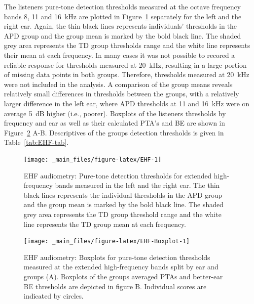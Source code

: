 \documentclass[a4paper, twoside]{templates/ociamthesis}
\begin{document}
The listeners pure-tone detection thresholds measured at the octave frequency bands 8, 11 and 16~kHz are plotted in Figure~\ref{fig:EHF} separately for the left and the right ear. Again, the thin black lines represents individuals' thresholds in the APD group and the group mean is marked by the bold black line. The shaded grey area represents the TD group thresholds range and the white line represents their mean at each frequency. In many cases it was not possible to recored a reliable response for thresholds measured at 20~kHz, resulting in a large portion of missing data points in both groups. Therefore, thresholds measured at 20~kHz were not included in the analysis. A comparison of the group means reveals relatively small differences in thresholds between the groups, with a relatively larger difference in the left ear, where APD thresholds at 11 and 16~kHz were on average 5~dB higher (i.e., poorer). Boxplots of the listeners thresholds by frequency and ear as well as their calculated PTA's and BE are shown in Figure~\ref{fig:EHF-Boxplot} A-B. Descriptives of the groups detection thresholds is given in Table~\ref{tab:EHF-tab}.\\

\begin{figure}

{\centering \texttt{[image: \_main\_files/figure-latex/EHF-1]} 

}

\caption{EHF audiometry: Pure-tone detection thresholds for extended high-frequency bands measured in the left and the right ear. The thin black lines represents the individual thresholds in the APD group and the group mean is marked by the bold black line. The shaded grey area represents the TD group threshold range and the white line represents the TD group mean at each frequency.}\label{fig:EHF}
\end{figure}

\begin{figure}

{\centering \texttt{[image: \_main\_files/figure-latex/EHF-Boxplot-1]} 

}

\caption{EHF audiometry: Boxplots for pure-tone detection thresholds measured at the extended high-frequency bands split by ear and groups (A). Boxplots of the groups averaged PTAs and better-ear BE thresholds are depicted in figure B. Individual scores are indicated by circles.}\label{fig:EHF-Boxplot}
\end{figure}
\end{document}
